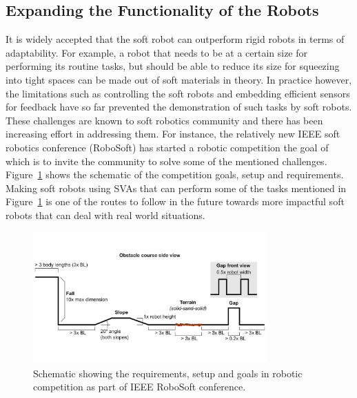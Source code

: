 \subsection{Expanding the Functionality of the Robots}
It is widely accepted that the soft robot can outperform rigid robots in terms of adaptability. For example, a robot that needs to be at a certain size for performing its routine tasks, but should be able to reduce its size for squeezing into tight spaces can be made out of soft materials in theory. In practice however, the limitations such as controlling the soft robots and embedding efficient sensors for feedback have so far prevented the demonstration of such tasks by soft robots. These challenges are known to soft robotics community and there has been increasing effort in addressing them. For instance, the relatively new IEEE soft robotics conference (RoboSoft) has started a robotic competition the goal of which is to invite the community to solve some of the mentioned challenges. Figure~\ref{fig:sorocomp} shows the schematic of the competition goals, setup and requirements. Making soft robots using SVAs that can perform some of the tasks mentioned in Figure~\ref{fig:sorocomp} is one of the routes to follow in the future towards more impactful soft robots that can deal with real world situations. 
\begin{figure}[!t]
\centering
\includegraphics[width=0.8\textwidth]{sorocomp.pdf}
    \caption[SoRo robotic competition]{Schematic showing the requirements, setup and goals in robotic competition as part of IEEE RoboSoft conference.}
    \label{fig:sorocomp}
\end{figure}

